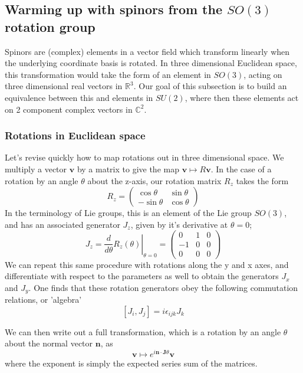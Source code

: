 \subsection{Warming up with spinors from the $SO(3)$ rotation group} 

Spinors are (complex) elements in a vector field which transform linearly when the underlying coordinate basis is rotated. In three dimensional Euclidean space, this transformation would take the form of an element in $SO(3)$, acting on three dimensional real vectors in $\mathbb{R}^3$. Our goal of this subsection is to build an equivalence between this and elements in $SU(2)$, where then these elements act on 2 component complex vectors in $\mathbb{C}^2$.

\subsubsection{Rotations in Euclidean space} 
Let's revise quickly how to map rotations out in three dimensional space. We multiply a vector $\mathbf{v} $ by a matrix to give the map $\mathbf{v} \mapsto R \mathbf{v}$. In the case of a rotation by an angle $\theta$ about the z-axis, our rotation matrix $R_z$ takes the form \[ R_z = \begin{pmatrix} \cos \theta & \sin \theta \\  - \sin \theta & \cos \theta \end{pmatrix} \] 
In the terminology of Lie groups, this is an element of the Lie group $SO(3)$, and has an associated generator $J_z$, given by it's derivative at $\theta = 0$; 
\[ J_z = \left. \frac{d}{ d\theta } R_z (\theta) \right\vert_{ \theta = 0 }  = \begin{pmatrix} 0 & 1 & 0 \\ -1 & 0 & 0 \\ 0 & 0 & 0 \end{pmatrix}  \]
We can repeat this same procedure with rotations along the y and x axes, and differentiate with respect to the parameters as well to obtain the generators $ J_x $ and $J_y$. One finds that these rotation generators obey the following commutation relations, or 'algebra' \[ [ J_i , J_j ] = i \epsilon_{ ijk} J_k \] 

We can then write out a full transformation, which is a rotation by an angle $\theta$ about the normal vector $\mathbf{ n } $, as \[ \mathbf{ v} \mapsto e^{ i  \mathbf{n} \cdot \mathbf{J} \theta } \mathbf{ v} \] where the exponent is simply the expected series sum of the matrices.  

